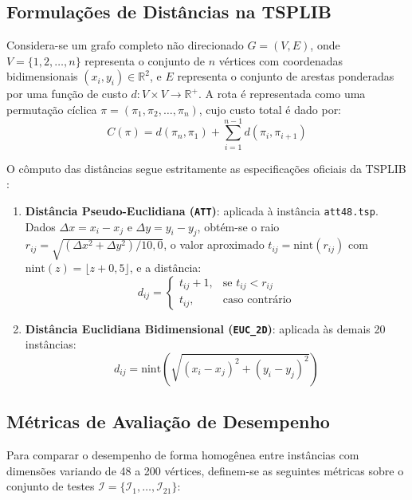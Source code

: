 \documentclass[12pt, a4paper]{article}
\begin{document}
\subsection{Formulações de Distâncias na TSPLIB}

Considera-se um grafo completo não direcionado $G = (V, E)$, onde $V = \{1, 2, \dots, n\}$ representa o conjunto de $n$ vértices com coordenadas bidimensionais $(x_i, y_i) \in \mathbb{R}^2$, e $E$ representa o conjunto de arestas ponderadas por uma função de custo $d: V \times V \to \mathbb{R}^+$. A rota é representada como uma permutação cíclica $\pi = (\pi_1, \pi_2, \dots, \pi_n)$, cujo custo total é dado por:
\begin{equation}
    C(\pi) = d(\pi_n, \pi_1) + \sum_{i=1}^{n-1} d(\pi_i, \pi_{i+1})
\end{equation}

O cômputo das distâncias segue estritamente as especificações oficiais da TSPLIB \cite{reinelt1991}:
\begin{enumerate}
    \item \textbf{Distância Pseudo-Euclidiana (\texttt{ATT})}: aplicada à instância \texttt{att48.tsp}. Dados $\Delta x = x_i - x_j$ e $\Delta y = y_i - y_j$, obtém-se o raio $r_{ij} = \sqrt{(\Delta x^2 + \Delta y^2)/10{,}0}$, o valor aproximado $t_{ij} = \mathrm{nint}(r_{ij})$ com $\mathrm{nint}(z) = \lfloor z + 0{,}5 \rfloor$, e a distância:
          \begin{equation}
              d_{ij} = \begin{cases} t_{ij} + 1, & \text{se } t_{ij} < r_{ij} \\ t_{ij}, & \text{caso contrário} \end{cases}
          \end{equation}
    \item \textbf{Distância Euclidiana Bidimensional (\texttt{EUC\_2D})}: aplicada às demais 20 instâncias:
          \begin{equation}
              d_{ij} = \mathrm{nint}\left(\sqrt{(x_i - x_j)^2 + (y_i - y_j)^2}\right)
          \end{equation}
\end{enumerate}

\subsection{Métricas de Avaliação de Desempenho}

Para comparar o desempenho de forma homogênea entre instâncias com dimensões variando de 48 a 200 vértices, definem-se as seguintes métricas sobre o conjunto de testes $\mathcal{I} = \{\mathcal{I}_1, \dots, \mathcal{I}_{21}\}$:
\end{document}
